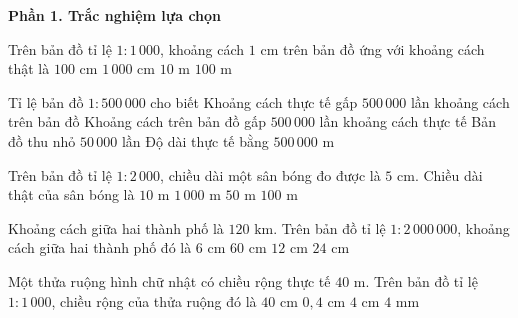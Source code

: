 \textbf{Phần 1. Trắc nghiệm lựa chọn}

\begin{ex} %
Trên bản đồ tỉ lệ $1 : 1\,000$, khoảng cách $1\text{ cm}$ trên bản đồ ứng với khoảng cách thật là
\choice
{$100\text{ cm}$}
{\True $1\,000\text{ cm}$}
{$10\text{ m}$}
{$100\text{ m}$}
\end{ex}

\begin{ex} %
Tỉ lệ bản đồ $1 : 500\,000$ cho biết
\choice
{\True Khoảng cách thực tế gấp $500\,000$ lần khoảng cách trên bản đồ}
{Khoảng cách trên bản đồ gấp $500\,000$ lần khoảng cách thực tế}
{Bản đồ thu nhỏ $50\,000$ lần}
{Độ dài thực tế bằng $500\,000\text{ m}$}
\end{ex}

\begin{ex} %
Trên bản đồ tỉ lệ $1 : 2\,000$, chiều dài một sân bóng đo được là $5\text{ cm}$. Chiều dài thật của sân bóng là
\choice
{$10\text{ m}$}
{$1\,000\text{ m}$}
{$50\text{ m}$}
{\True $100\text{ m}$}
\end{ex}

\begin{ex} %
Khoảng cách giữa hai thành phố là $120\text{ km}$. Trên bản đồ tỉ lệ $1 : 2\,000\,000$, khoảng cách giữa hai thành phố đó là
\choice
{\True $6\text{ cm}$}
{$60\text{ cm}$}
{$12\text{ cm}$}
{$24\text{ cm}$}
\end{ex}

\begin{ex} %
Một thửa ruộng hình chữ nhật có chiều rộng thực tế $40\text{ m}$. Trên bản đồ tỉ lệ $1 : 1\,000$, chiều rộng của thửa ruộng đó là
\choice
{$40\text{ cm}$}
{$0{,}4\text{ cm}$}
{\True $4\text{ cm}$}
{$4\text{ mm}$}
\end{ex}

